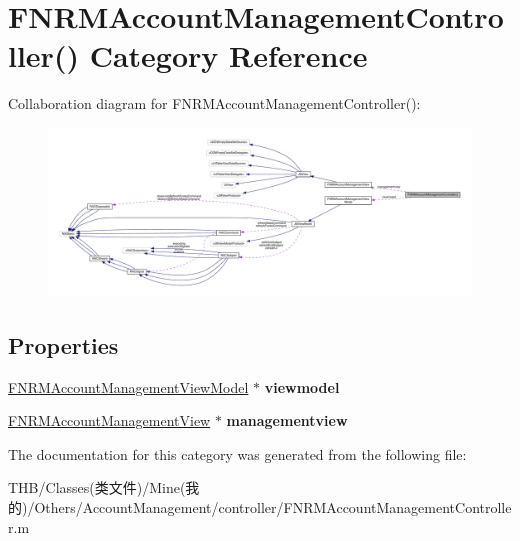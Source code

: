 \hypertarget{category_f_n_r_m_account_management_controller_07_08}{}\section{F\+N\+R\+M\+Account\+Management\+Controller() Category Reference}
\label{category_f_n_r_m_account_management_controller_07_08}


Collaboration diagram for F\+N\+R\+M\+Account\+Management\+Controller()\+:\nopagebreak
\begin{figure}[H]
\begin{center}
\leavevmode
\includegraphics[width=350pt]{category_f_n_r_m_account_management_controller_07_08__coll__graph}
\end{center}
\end{figure}
\subsection*{Properties}
\begin{DoxyCompactItemize}
\item 
\mbox{\label{category_f_n_r_m_account_management_controller_07_08_a1453824df6475396a754dc964dd9ddec}} 
\mbox{\hyperlink{interface_f_n_r_m_account_management_view_model}{F\+N\+R\+M\+Account\+Management\+View\+Model}} $\ast$ {\bfseries viewmodel}
\item 
\mbox{\label{category_f_n_r_m_account_management_controller_07_08_a44d781fec02c9a207f99ac1bacf5b99f}} 
\mbox{\hyperlink{interface_f_n_r_m_account_management_view}{F\+N\+R\+M\+Account\+Management\+View}} $\ast$ {\bfseries managementview}
\end{DoxyCompactItemize}


The documentation for this category was generated from the following file\+:\begin{DoxyCompactItemize}
\item 
T\+H\+B/\+Classes(类文件)/\+Mine(我的)/\+Others/\+Account\+Management/controller/F\+N\+R\+M\+Account\+Management\+Controller.\+m\end{DoxyCompactItemize}
